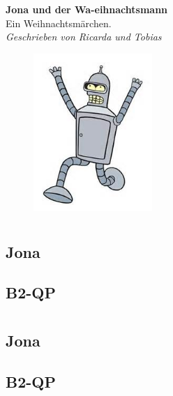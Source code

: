 \documentclass{article}
\begin{document}
\begin{titlepage}
\begin{center}
\vspace*{2cm}
{\LARGE \bf Jona und der Wa-eihnachtsmann\\[2cm]}
{\Large Ein Weihnachtsmärchen.\\[1cm]}
{\Large \it Geschrieben von Ricarda und Tobias\\[1cm]}
\end{center}
\begin{figure}[h!]
\centering
\includegraphics[width=0.4\textwidth]{bender}
\end{figure}
\end{titlepage}

\section{}
\subsection*{Jona}


\subsection*{B2-QP}


\section{}
\subsection*{Jona}


\subsection*{B2-QP}

\end{document}
